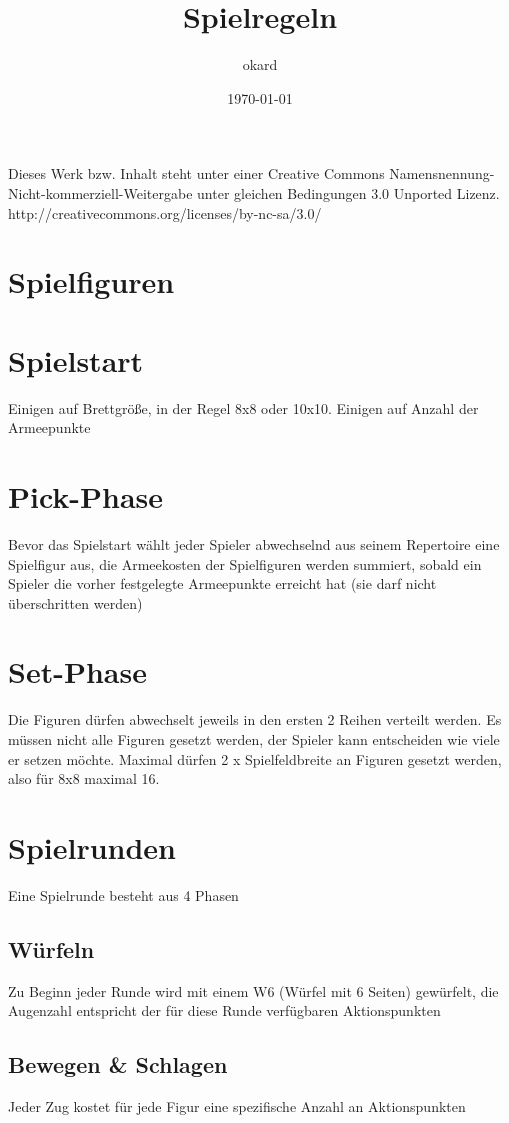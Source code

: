 \documentclass{article}
\title{Spielregeln}
\author{okard}
\date{\today}
\begin{document}
Dieses Werk bzw. Inhalt steht unter einer Creative Commons Namensnennung-Nicht-kommerziell-Weitergabe unter gleichen Bedingungen 3.0 Unported Lizenz.
http://creativecommons.org/licenses/by-nc-sa/3.0/

\section{Spielfiguren}

\section{Spielstart}
Einigen auf Brettgröße, in der Regel 8x8 oder 10x10.
Einigen auf Anzahl der Armeepunkte

\section{Pick-Phase}
Bevor das Spielstart wählt jeder Spieler abwechselnd aus seinem Repertoire eine Spielfigur aus, die Armeekosten der Spielfiguren werden summiert, sobald ein Spieler die vorher festgelegte Armeepunkte erreicht hat (sie darf nicht überschritten werden)

\section{Set-Phase}
Die Figuren dürfen abwechselt jeweils in den ersten 2 Reihen verteilt werden. Es müssen nicht alle Figuren gesetzt werden, der Spieler kann entscheiden wie viele er setzen möchte. Maximal dürfen 2 x Spielfeldbreite an Figuren gesetzt werden, also für 8x8 maximal 16.

\section{Spielrunden}

Eine Spielrunde besteht aus 4 Phasen

\subsection{Würfeln}
Zu Beginn jeder Runde wird mit einem W6 (Würfel mit 6 Seiten) gewürfelt, 
die Augenzahl entspricht der für diese Runde verfügbaren Aktionspunkten 
	
\subsection{Bewegen \& Schlagen}
Jeder Zug kostet für jede Figur eine spezifische Anzahl an Aktionspunkten
\end{document}
